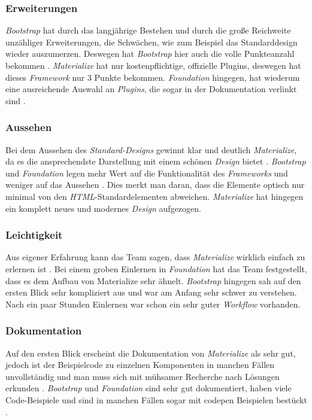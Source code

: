 \subsubsection{Erweiterungen}
\label{chapter:study-frontend-vergleich-erweiterungen}
\textit{Bootstrap} hat durch das langjährige Bestehen und durch die große Reichweite unzähliger Erweiterungen, die Schwächen, wie zum Beispiel das Standarddesign wieder auszumerzen. Deswegen hat \textit{Bootstrap} hier auch die volle Punkteanzahl bekommen \cite{introduction-bootstrap}. \textit{Materialize} hat nur kostenpflichtige, offizielle Plugins, deswegen hat dieses \textit{Framework} nur 3 Punkte bekommen. \textit{Foundation} hingegen, hat wiederum eine ausreichende Auswahl an \textit{Plugins}, die sogar in der Dokumentation verlinkt sind \cite{foundation-webdocu}. 
\subsubsection{Aussehen}
\label{chapter:study-frontend-vergleich-aussehen}
Bei dem Aussehen des \textit{Standard-Designs} gewinnt klar und deutlich \textit{Materialize}, da es die ansprechendste Darstellung mit einem schönen \textit{Design} bietet \cite{WebDocMaterialize}. \textit{Bootstrap} und \textit{Foundation} legen mehr Wert auf die Funktionalität des \textit{Frameworks} und weniger auf das Aussehen \cite{bootstrap-docu, foundation-webdocu}. Dies merkt man daran, dass die Elemente optisch nur minimal von den \textit{HTML}-Standardelementen abweichen. \textit{Materialize} hat hingegen ein komplett neues und modernes \textit{Design} aufgezogen.
\subsubsection{Leichtigkeit}
\label{chapter:study-frontend-vergleich-leichtigkeit}
Aus eigener Erfahrung kann das Team sagen, dass \textit{Materialize} wirklich einfach zu erlernen ist \cite{WebDocMaterialize}. Bei einem groben Einlernen in \textit{Foundation} hat das Team festgestellt, dass es dem Aufbau von Materialize sehr ähnelt. \textit{Bootstrap} hingegen sah auf den ersten Blick sehr kompliziert aus und war am Anfang sehr schwer zu verstehen. Nach ein paar Stunden Einlernen war schon ein sehr guter \textit{Workflow} vorhanden.
\subsubsection{Dokumentation}
\label{chapter:study-frontend-vergleich-doku}
Auf den ersten Blick erscheint die Dokumentation von \textit{Materialize} als sehr gut, jedoch ist der Beispielcode zu einzelnen Komponenten in manchen Fällen unvollständig und man muss sich mit mühsamer Recherche nach Lösungen erkunden \cite{WebDocMaterialize}. \textit{Bootstrap} und \textit{Foundation} sind sehr gut dokumentiert, haben viele Code-Beispiele und sind in manchen Fällen sogar mit \Gls{codepen} Beispielen bestückt \cite{bootstrap-docu, foundation-webdocu}.

